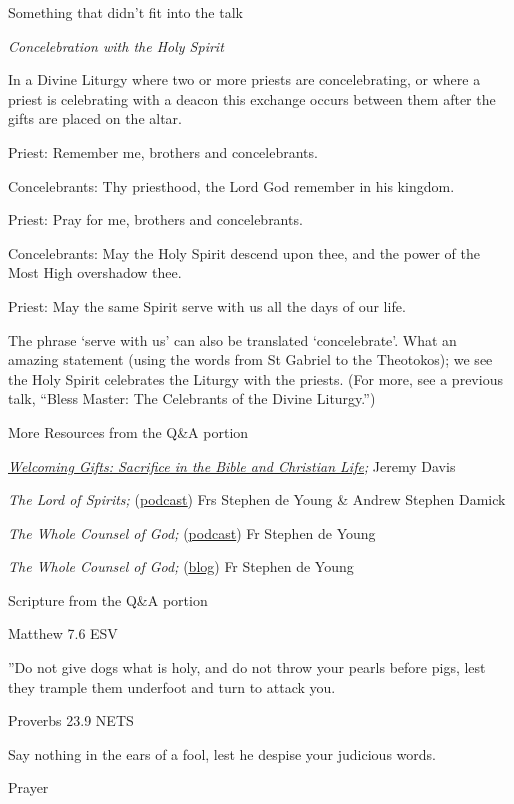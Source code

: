 \documentclass[
]{article}
\newcommand{\RL}[1]{\beginR #1\endR}
\begin{document}
Something that didn't fit into the talk

\emph{Concelebration with the Holy Spirit}

In a Divine Liturgy where two or more priests are concelebrating, or
where a priest is celebrating with a deacon this exchange occurs between
them after the gifts are placed on the altar.

Priest: Remember me, brothers and concelebrants.

Concelebrants: Thy priesthood, the Lord God remember in his kingdom.

Priest: Pray for me, brothers and concelebrants.

Concelebrants: May the Holy Spirit descend upon thee, and the power of
the Most High overshadow thee.

Priest: May the same Spirit serve with us all the days of our life.

The phrase `serve with us' can also be translated `concelebrate'. What
an amazing statement (using the words from St Gabriel to the Theotokos);
we see the Holy Spirit celebrates the Liturgy with the priests. (For
more, see a previous talk, ``Bless Master: The Celebrants of the Divine
Liturgy.'')

More Resources from the Q\&A portion

\emph{\href{https://store.ancientfaith.com/welcoming-gifts-sacrifice-in-the-bible-and-christian-life/}{\ul{Welcoming
Gifts: Sacrifice in the Bible and Christian Life}};} Jeremy Davis

\emph{The Lord of Spirits;}
(\href{https://www.ancientfaith.com/podcasts/lordofspirits}{\ul{podcast}})
Frs Stephen de Young \& Andrew Stephen Damick

\emph{The Whole Counsel of God;}
(\href{https://www.ancientfaith.com/podcasts/wholecounsel}{\ul{podcast}})
Fr Stephen de Young

\emph{The Whole Counsel of God;}
(\href{https://blogs.ancientfaith.com/wholecounsel/}{\ul{blog}}) Fr
Stephen de Young

Scripture from the Q\&A portion

Matthew 7.6 ESV

\RL{''}Do not give dogs what is holy, and do not throw your pearls
before pigs, lest they trample them underfoot and turn to attack you.

Proverbs 23.9 NETS

Say nothing in the ears of a fool, lest he despise your judicious words.

Prayer
\end{document}
